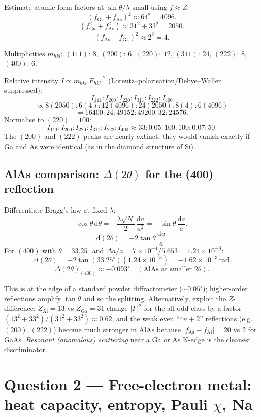 \documentclass[11pt]{article}
\newcommand{\de}{\mathrm{d}}
\begin{document}
Estimate atomic form factors at $\sin\theta/\lambda$ small using $f\approx Z$:
\[ (f_\text{Ga}+f_\text{As})^{2}\approx 64^{2}=4096. \]
\[ (f_\text{Ga}^{2}+f_\text{As}^{2})\approx 31^{2}+33^{2}=2050. \]
\[ (f_\text{As}-f_\text{Ga})^{2}\approx 2^{2}=4. \]

Multiplicities $m_{hkl}$: $(111){:}\,8$, $(200){:}\,6$, $(220){:}\,12$, $(311){:}\,24$, $(222){:}\,8$, $(400){:}\,6$.

Relative intensity $I\propto m_{hkl}|F_{hkl}|^{2}$ (Lorentz--polarisation/Debye--Waller suppressed):
\[
I_{111}:I_{200}:I_{220}:I_{311}:I_{222}:I_{400}
\]
\[
\propto 8(2050) : 6(4) : 12(4096) : 24(2050) : 8(4) : 6(4096)
\]
\[
= 16400 : 24 : 49152 : 49200 : 32 : 24576.
\]
Normalise to $(220)=100$:
\[
\boxed{\;I_{111}{:}I_{200}{:}I_{220}{:}I_{311}{:}I_{222}{:}I_{400}\approx 33{:}0.05{:}100{:}100{:}0.07{:}50.\;}
\]
The $(200)$ and $(222)$ peaks are nearly extinct: they would vanish exactly if Ga and As were identical (as in the diamond structure of Si).

\subsection*{AlAs comparison: $\Delta(2\theta)$ for the (400) reflection}

Differentiate Bragg's law at fixed $\lambda$:
\[ \cos\theta\,\de\theta = -\frac{\lambda\sqrt N}{2}\,\frac{\de a}{a^{2}} = -\sin\theta\,\frac{\de a}{a}. \]
\[ \de(2\theta) = -2\tan\theta\,\frac{\de a}{a}. \]
For $(400)$ with $\theta=33.25^\circ$ and $\Delta a/a = 7\times 10^{-4}/5.653 = 1.24\times 10^{-3}$:
\[ \Delta(2\theta) = -2\tan(33.25^\circ)(1.24\times 10^{-3}) = -1.62\times 10^{-3}\,\text{rad}. \]
\[ \boxed{\;\Delta(2\theta)_{(400)}\approx -0.093^\circ\quad(\text{AlAs at smaller }2\theta).\;} \]

This is at the edge of a standard powder diffractometer ($\sim 0.05^\circ$); higher-order reflections amplify $\tan\theta$ and so the splitting. Alternatively, exploit the $Z$-difference: $Z_\text{Al}=13$ vs $Z_\text{Ga}=31$ change $|F|^{2}$ for the all-odd class by a factor $(13^{2}+33^{2})/(31^{2}+33^{2})\approx 0.62$, and the weak even ``$4n+2$'' reflections (e.g.\ $(200),(222)$) become much stronger in AlAs because $|f_\text{As}-f_\text{Al}|=20$ vs $2$ for GaAs. \emph{Resonant (anomalous) scattering} near a Ga or As K-edge is the cleanest discriminator.

\section*{Question 2 --- Free-electron metal: heat capacity, entropy, Pauli $\chi$, Na}
\end{document}
